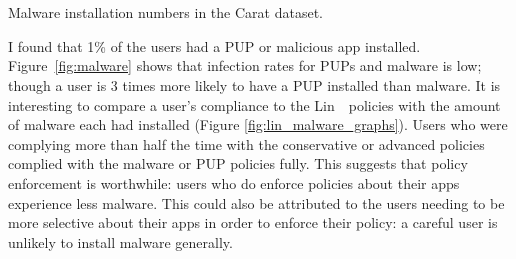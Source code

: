 \documentclass[thesis.tex]{subfiles}
\begin{document}
\begin{marginfigure}
  \centering
  \\
  \\
  \caption{Malware installation numbers in the Carat dataset.}
  \label{fig:malware}
\end{marginfigure}
I found that 1\% of the users had a \ac{PUP} or malicious app installed.
Figure~\ref{fig:malware} shows that infection rates for \acp{PUP} and malware is low;
though a user is 3 times more likely to have a \ac{PUP} installed than malware.
It is interesting to compare a user's compliance to the Lin~\etal~policies with the amount of malware each had installed (Figure \autoref{fig:lin_malware_graphs}).
Users who were complying more than half the time with the conservative or advanced policies complied with the malware or \ac{PUP} policies fully.
This suggests that policy enforcement is worthwhile: users who do enforce policies about their apps experience less malware.
This could also be attributed to the users needing to be more selective about their apps in order to enforce their policy: a careful user is unlikely to install malware generally.
\end{document}
